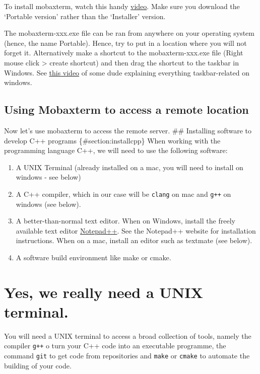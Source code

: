 \documentclass[
]{book}
\providecommand{\tightlist}{%
  \setlength{\itemsep}{0pt}\setlength{\parskip}{0pt}}
\begin{document}
To install mobaxterm, watch this handy \href{https://www.youtube.com/watch?v=KRpgYS-eHj8\&t=87s}{video}. Make sure you download the `Portable version' rather than the `Installer' version.

The mobaxterm-xxx.exe file can be ran from anywhere on your operating system (hence, the name Portable). Hence, try to put in a location where you will not forget it. Alternatively make a shortcut to the mobaxterm-xxx.exe file (Right mouse click \textgreater{} create shortcut) and then drag the shortcut to the taskbar in Windows. See \href{https://www.youtube.com/watch?v=3K9oYys-tYE}{this video} of some dude explaining everything taskbar-related on windows.

\hypertarget{using-mobaxterm-to-access-a-remote-location}{%
\subsection{Using Mobaxterm to access a remote location}\label{using-mobaxterm-to-access-a-remote-location}}

Now let's use mobaxterm to access the remote server.
\#\# Installing software to develop C++ programs \{\#section:installcpp\}
When working with the programming language C++, we will need to use the following software:

\begin{enumerate}
\def\labelenumi{\arabic{enumi}.}
\tightlist
\item
  A UNIX Terminal (already installed on a mac, you will need to install on windows - see below)
\item
  A C++ compiler, which in our case will be \texttt{clang} on mac and \texttt{g++} on windows (see below).
\item
  A better-than-normal text editor. When on Windows, install the freely available text editor \href{}{Notepad++}. See the Notepad++ website for installation instructions. When on a mac, install an editor such as textmate (see below).
\item
  A software build environment like make or cmake.
\end{enumerate}

\hypertarget{yes-we-really-need-a-unix-terminal.}{%
\section{Yes, we really need a UNIX terminal.}\label{yes-we-really-need-a-unix-terminal.}}

You will need a UNIX terminal to access a broad collection of tools, namely the compiler \texttt{g++} o turn your C++ code into an executable programme, the command \texttt{git} to get code from repositories and \texttt{make} or \texttt{cmake} to automate the building of your code.
\end{document}

